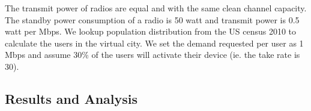 The transmit power of radios are equal and with the same clean channel capacity. 
The standby power consumption of a radio is 50 watt and transmit power is 0.5 watt per Mbps.
We lookup population distribution from the US census 2010 to calculate the users in the 
virtual city. We set the demand requested per user as 1 Mbps and assume 30\% of the users will 
activate their device (ie. the take rate is 30). 














\subsection{Results and Analysis}
\label{subsec:results}
















